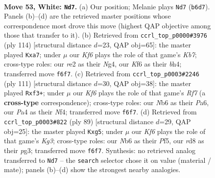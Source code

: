 \documentclass[11pt]{article}
\begin{document}
\clearpage

\begin{figure}[p]\centering
\begin{subfigure}{0.46\textwidth}\centering
\resizebox{\linewidth}{!}{%
\newchessgame
\chessboard[
  setfen={3r4/1p5k/1N3Kpb/5p1p/P7/6PP/4r3/8 w - - 2 53},
  showmover=false,
  pgfstyle=straightmove, color=movearrow, markmove={b6-d7}
]}
\caption{}
\end{subfigure}\hfill
\begin{subfigure}{0.46\textwidth}\centering
\resizebox{\linewidth}{!}{%
\newchessgame
\chessboard[
  setfen={8/pK6/1p1kp1p1/6P1/P5Nb/4P3/8/8 w - - 7 58},
  showmover=false,
  pgfstyle=straightmove, color=movearrow, markmove={b7-a7}
]}
\caption{}
\end{subfigure}
\\[4pt]
\begin{subfigure}{0.46\textwidth}\centering
\resizebox{\linewidth}{!}{%
\newchessgame
\chessboard[
  setfen={5k2/1R6/p4pp1/8/5nP1/1PK2P2/P1N2r2/8 b - - 0 56},
  showmover=false,
  pgfstyle=straightmove, color=movearrow, markmove={f2-f3}
]}
\caption{}
\end{subfigure}\hfill
\begin{subfigure}{0.46\textwidth}\centering
\resizebox{\linewidth}{!}{%
\newchessgame
\chessboard[
  setfen={8/R7/4p1k1/p4pP1/8/4P1P1/3r1P2/5K2 b - - 0 45},
  showmover=false,
  pgfstyle=straightmove, color=movearrow, markmove={g6-g5}
]}
\caption{}
\end{subfigure}
\caption{\textbf{Move 53, White: \texttt{Nd7}.} (a) Our position; Melanie plays \texttt{Nd7} (\texttt{b6d7}). Panels (b)--(d) are the retrieved master positions whose correspondence most drove this move (highest QAP objective among those that transfer to it). (b) Retrieved from \texttt{ccrl\_top\_p0000\#3976} (ply 114) [structural distance $d$=23, QAP obj=65]: the master played \texttt{Kxa7}; under $\mu$ our \emph{Kf6} plays the role of that game's \emph{Kb7}; cross-type roles: our \emph{r}e2 as their \emph{N}g4, our \emph{K}f6 as their \emph{b}h4; transferred move \texttt{f6f7}. (c) Retrieved from \texttt{ccrl\_top\_p0003\#2246} (ply 111) [structural distance $d$=30, QAP obj=38]: the master played \texttt{Rxf3+}; under $\mu$ our \emph{Kf6} plays the role of that game's \emph{Rf7} (a \textbf{cross-type} correspondence); cross-type roles: our \emph{N}b6 as their \emph{P}a6, our \emph{P}a4 as their \emph{N}f4; transferred move \texttt{f6f7}. (d) Retrieved from \texttt{ccrl\_top\_p0003\#822} (ply 89) [structural distance $d$=29, QAP obj=25]: the master played \texttt{Kxg5}; under $\mu$ our \emph{Kf6} plays the role of that game's \emph{Kg3}; cross-type roles: our \emph{N}b6 as their \emph{P}f5, our \emph{r}d8 as their \emph{p}g3; transferred move \texttt{f6f7}. Synthesis: no retrieved analog transferred to \texttt{Nd7} -- the \texttt{search} selector chose it on value (material / mate); panels (b)--(d) show the strongest nearby analogies.}
\label{fig:thought-m104}
\end{figure}
\end{document}
